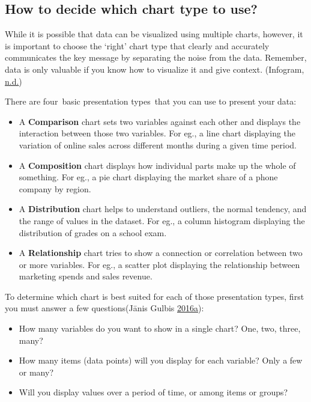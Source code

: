 \documentclass[]{book}
\providecommand{\tightlist}{%
  \setlength{\itemsep}{0pt}\setlength{\parskip}{0pt}}
\begin{document}
\hypertarget{how-to-decide-which-chart-type-to-use}{%
\subsection{How to decide which chart type to use?}\label{how-to-decide-which-chart-type-to-use}}

While it is possible that data can be visualized using multiple charts, however, it is important to choose the `right' chart type that clearly and accurately communicates the key message by separating the noise from the data. Remember, data is only valuable if you know how to visualize it and give context. (Infogram, \protect\hyperlink{ref-presentation_type}{n.d.})

There are four~basic presentation types~that you can use to present your data:

\begin{itemize}
\tightlist
\item
  A \textbf{Comparison} chart sets two variables against each other and displays the interaction between those two variables. For eg., a line chart displaying the variation of online sales across different months during a given time period.
\item
  A \textbf{Composition} chart displays how individual parts make up the whole of something. For eg., a pie chart displaying the market share of a phone company by region.
\item
  A \textbf{Distribution} chart helps to understand outliers, the normal tendency, and the range of values in the dataset. For eg., a column histogram displaying the distribution of grades on a school exam.
\item
  A \textbf{Relationship} chart tries to show a connection or correlation between two or more variables. For eg., a scatter plot displaying the relationship between marketing spends and sales revenue.
\end{itemize}

To determine which chart is best suited for each of those presentation types, first you must answer a few questions(Jānis Gulbis \protect\hyperlink{ref-chart_selection}{2016}\protect\hyperlink{ref-chart_selection}{a}):

\begin{itemize}
\tightlist
\item
  How many variables do you want to show in a single chart? One, two, three, many?
\item
  How many items (data points) will you display for each variable? Only a few or many?
\item
  Will you display values over a period of time, or among items or groups?
\end{itemize}
\end{document}
